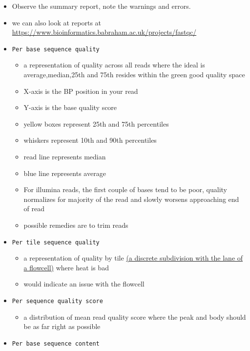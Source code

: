 \documentclass[
]{book}
\providecommand{\tightlist}{%
  \setlength{\itemsep}{0pt}\setlength{\parskip}{0pt}}
\begin{document}
\begin{itemize}
\tightlist
\item
  Observe the summary report, note the warnings and errors.
\item
  we can also look at reports at \url{https://www.bioinformatics.babraham.ac.uk/projects/fastqc/}
\item
  \texttt{Per\ base\ sequence\ quality}

  \begin{itemize}
  \tightlist
  \item
    a representation of quality across all reads where the ideal is average,median,25th and 75th resides within the green good quality space
  \item
    X-axis is the BP position in your read
  \item
    Y-axis is the base quality score
  \item
    yellow boxes represent 25th and 75th percentiles
  \item
    whiskers represent 10th and 90th percentiles
  \item
    read line represents median
  \item
    blue line represents average
  \item
    For illumina reads, the first couple of bases tend to be poor, quality normalizes for majority of the read and slowly worsens approaching end of read
  \item
    possible remedies are to trim reads
  \end{itemize}
\item
  \texttt{Per\ tile\ sequence\ quality}

  \begin{itemize}
  \tightlist
  \item
    a representation of quality by tile \href{https://gtk-teaching.github.io/NGS-intro/fig/hiseq-flow-cell.png}{(a discrete subdivision with the lane of a flowcell)} where heat is bad
  \item
    would indicate an issue with the flowcell
  \end{itemize}
\item
  \texttt{Per\ sequence\ quality\ score}

  \begin{itemize}
  \tightlist
  \item
    a distribution of mean read quality score where the peak and body should be as far right as possible
  \end{itemize}
\item
  \texttt{Per\ base\ sequence\ content}


\end{itemize}
\end{document}
